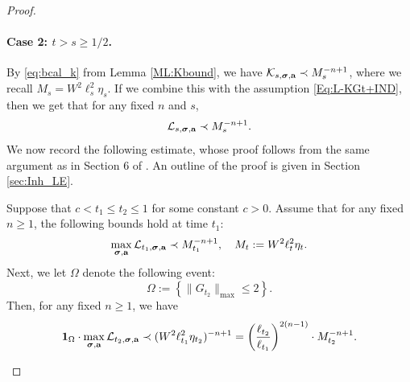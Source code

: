 \begin{proof}
\paragraph{Case 2: \(t > s \geq 1/2\).} 
By \eqref{eq:bcal_k} from Lemma \ref{ML:Kbound}, we have ${\cal K}_{s, \boldsymbol{\sigma}, \textbf{a}} \prec M_{s}^{-n+1}$, where we recall $M_{s}=W^{2}\ell_{s}^{2}\eta_{s}$. If we combine this with the assumption \eqref{Eq:L-KGt+IND}, then we get that for any fixed \(n\) and \(s\), 
\begin{equation}\label{Lboundfors}
    {\cal L}_{s, \boldsymbol{\sigma}, \textbf{a}}\prec M_{s}^{-n+1}.
\end{equation}
We now record the following estimate, whose proof follows from the same argument as in Section 6 of \cite{YY_25}. {An outline of the proof is given in Section \ref{sec:Inh_LE}.}



\begin{lemma}\label{lem_ConArg}
Suppose that \(c < t_1 \leq t_2 \leq 1\) for some constant \(c > 0\). Assume that for any fixed \(n\geq1\), the following bounds hold at time \(t_1\): 
\begin{equation}\label{55}
    \max_{\boldsymbol{\sigma}, \textbf{a}} {\cal L}_{t_1, \boldsymbol{\sigma}, \textbf{a}} \prec M_{t_{1}}^{-n+1},\quad M_{t}:=W^{2}\ell_{t}^{2}\eta_{t}.
\end{equation}
Next, we let $\Omega$ denote the following event:
\begin{equation}\label{usuayzoo}
    \Omega := \left\{\|G_{t_2}\|_{\max} \leq 2\right\}.
\end{equation}
Then, for any fixed \(n \geq 1\), we have
\begin{equation}\label{res_lo_bo_eta}
    {\bf 1}_\Omega \cdot \max_{\boldsymbol{\sigma}, \textbf{a}} {\cal L}_{t_2, \boldsymbol{\sigma}, \textbf{a}} \prec (W^{2}\ell_{t_{1}}^{2}\eta_{t_{2}})^{-n+1} = \left( \frac{\ell_{t_{2}}}{\ell_{t_{1}}} \right)^{2(n-1)} \cdot M_{t_{2}}^{-n+1}.
\end{equation}
\end{lemma}


\end{proof}
